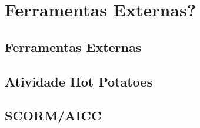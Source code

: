 \chapter{Ferramentas Externas?}
\label{cap9}

\section{Ferramentas Externas}

\section{Atividade Hot Potatoes}

\section{SCORM/AICC}


